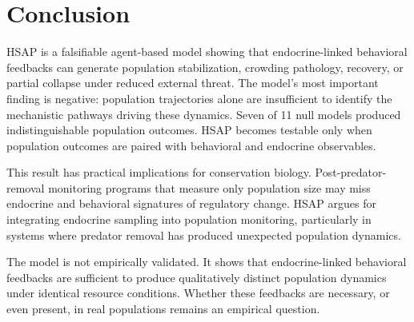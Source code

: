\section{Conclusion}
\label{sec:conclusion}

HSAP is a falsifiable agent-based model showing that endocrine-linked behavioral feedbacks can generate population stabilization, crowding pathology, recovery, or partial collapse under reduced external threat. The model's most important finding is negative: population trajectories alone are insufficient to identify the mechanistic pathways driving these dynamics. Seven of 11 null models produced indistinguishable population outcomes. HSAP becomes testable only when population outcomes are paired with behavioral and endocrine observables.

This result has practical implications for conservation biology. Post-predator-removal monitoring programs that measure only population size may miss endocrine and behavioral signatures of regulatory change. HSAP argues for integrating endocrine sampling into population monitoring, particularly in systems where predator removal has produced unexpected population dynamics.

The model is not empirically validated. It shows that endocrine-linked behavioral feedbacks are sufficient to produce qualitatively distinct population dynamics under identical resource conditions. Whether these feedbacks are necessary, or even present, in real populations remains an empirical question.
